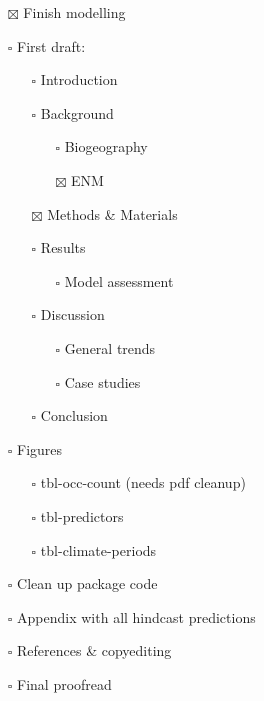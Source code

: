 \documentclass[
  authoryear,
  review]{elsarticle}
\providecommand{\tightlist}{%
  \setlength{\itemsep}{0pt}\setlength{\parskip}{0pt}}\usepackage{longtable,booktabs,array}
\begin{document}
\begin{itemize}
\tightlist
\item[$\boxtimes$]
  Finish modelling
\item[$\square$]
  First draft:

  \begin{itemize}
  \tightlist
  \item[$\square$]
    Introduction
  \item[$\square$]
    Background

    \begin{itemize}
    \tightlist
    \item[$\square$]
      Biogeography
    \item[$\boxtimes$]
      ENM
    \end{itemize}
  \item[$\boxtimes$]
    Methods \& Materials
  \item[$\square$]
    Results

    \begin{itemize}
    \tightlist
    \item[$\square$]
      Model assessment
    \end{itemize}
  \item[$\square$]
    Discussion

    \begin{itemize}
    \tightlist
    \item[$\square$]
      General trends
    \item[$\square$]
      Case studies
    \end{itemize}
  \item[$\square$]
    Conclusion
  \end{itemize}
\item[$\square$]
  Figures

  \begin{itemize}
  \tightlist
  \item[$\square$]
    tbl-occ-count (needs pdf cleanup)
  \item[$\square$]
    tbl-predictors
  \item[$\square$]
    tbl-climate-periods
  \end{itemize}
\item[$\square$]
  Clean up package code
\item[$\square$]
  Appendix with all hindcast predictions
\item[$\square$]
  References \& copyediting
\item[$\square$]
  Final proofread
\end{itemize}
\end{document}
